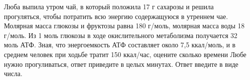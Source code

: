
Люба выпила утром чай, в который положила 17 г
сахарозы и решила прогуляться, чтобы потратить всю энергию содержащуюся в
утреннем чае. Молярная масса глюкозы и фруктозы равна 180 г/моль, молярная
масса воды 18 г/моль. Из 1 моль глюкозы в ходе окислительного метаболизма
получается 32  моль АТФ. Зная, что
энергоемкость АТФ составляет около 7,5 ккал/моль, и в среднем человек при
ходьбе тратит 150 ккал/час, оцените сколько времени Любе нужно прогуливаться,
ответ приведите в целых минутах. Ответ введите в виде числа.

\explanationSection

